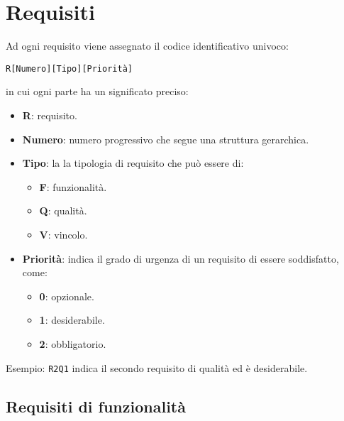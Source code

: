 



\section{Requisiti}
Ad ogni requisito viene assegnato il codice identificativo univoco:
	\begin{center}
		\texttt{R[Numero][Tipo][Priorità]}
	\end{center}
	in cui ogni parte ha un significato preciso:
	\begin{itemize}
		\item \textbf{R}: requisito.
		\item \textbf{Numero}: numero progressivo che segue una struttura gerarchica.
		\item \textbf{Tipo}: la la tipologia di requisito che può essere di:
		\begin{itemize}
			\item \textbf{F}: funzionalità.
			\item \textbf{Q}: qualità.
			\item \textbf{V}: vincolo.
		\end{itemize}
		\item \textbf{Priorità}: indica il grado di urgenza di un requisito di essere soddisfatto, come:
		\begin{itemize}
			\item \textbf{0}: opzionale.
			\item \textbf{1}: desiderabile.
			\item \textbf{2}: obbligatorio.
		\end{itemize}
	\end{itemize}


	Esempio: \texttt{R2Q1} indica il secondo requisito di qualità ed è desiderabile.





	\subsection{Requisiti di funzionalità}\label{RequisitiFunzionalità}

